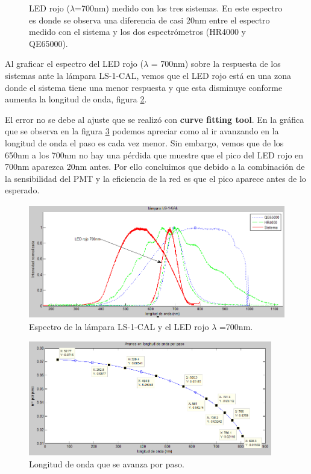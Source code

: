 \begin{figure}[h]
	\centering
	\caption[LED rojo, de longitud de onda 700nm]{LED rojo ($\lambda$=700nm) medido con los tres sistemas. En este espectro es donde se observa una diferencia de casi 20nm entre el espectro medido con el sistema y los dos espectrómetros (HR4000 y QE65000).}
	\label{fig:r700}
\end{figure}
\clearpage
Al graficar el espectro del LED rojo ($\lambda$ = 700nm) sobre la respuesta de los sistemas ante la lámpara LS-1-CAL, vemos que el LED rojo está en una zona donde el sistema tiene una menor respuesta y que esta disminuye conforme aumenta la longitud de onda, figura \ref{fig:ls-rojo}. 

El error no se debe al ajuste que se realizó con \textbf{curve fitting tool}. En la gráfica que se observa en la figura \ref{fig:pasotam} podemos apreciar como al ir avanzando en la longitud de onda el paso es cada vez menor. Sin embargo, vemos que de los 650nm a los 700nm no hay una pérdida que muestre que el pico del LED rojo en 700nm aparezca 20nm antes. Por ello concluimos que debido a la combinación de la sensibilidad del PMT y la eficiencia de la red es que el pico aparece antes de lo esperado. 
\begin{figure}[h]
	\centering
	\includegraphics[width=0.9\linewidth,height=5cm]{Imagenes/4/ls-rojo}
	\caption{Espectro de la lámpara LS-1-CAL y el LED rojo $\lambda$ =700nm.}
	\label{fig:ls-rojo}
\end{figure}
\begin{figure}[h]
	\centering
	\includegraphics[width=0.9\linewidth,height=5cm]{Imagenes/4/pasotam}
	\caption{Longitud de onda que se avanza por paso.}
	\label{fig:pasotam}
\end{figure}

